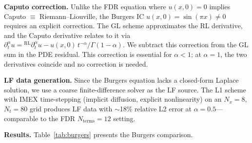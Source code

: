 \documentclass[11pt]{article}
\begin{document}
\textbf{Caputo correction.} Unlike the FDR equation where $u(x,0) = 0$ implies Caputo $\equiv$ Riemann--Liouville, the Burgers IC $u(x,0) = \sin(\pi x) \neq 0$ requires an explicit correction. The GL scheme approximates the RL derivative, and the Caputo derivative relates to it via $\partial_t^\alpha u = {}^{\mathrm{RL}}\!\partial_t^\alpha u - u(x,0)\, t^{-\alpha}/\Gamma(1-\alpha)$. We subtract this correction from the GL sum in the PDE residual. This correction is essential for $\alpha < 1$; at $\alpha = 1$, the two derivatives coincide and no correction is needed.

\textbf{LF data generation.} Since the Burgers equation lacks a closed-form Laplace solution, we use a coarse finite-difference solver as the LF source. The L1 scheme \cite{sun2006fully} with IMEX time-stepping (implicit diffusion, explicit nonlinearity) on an $N_x = 8$, $N_t = 80$ grid produces LF data with $\sim$18\% relative L2 error at $\alpha = 0.5$---comparable to the FDR $N_{\mathrm{terms}} = 12$ setting.

\textbf{Results.} Table~\ref{tab:burgers} presents the Burgers comparison.
\end{document}
